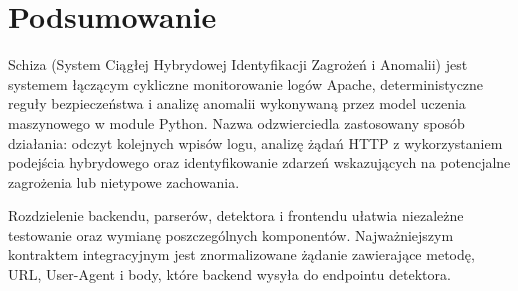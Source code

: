 \documentclass[12pt,a4paper]{article}
\newcommand{\project}{Schiza}
\begin{document}
\section{Podsumowanie}

\project{} (System Ciągłej Hybrydowej Identyfikacji Zagrożeń i Anomalii) jest
systemem łączącym cykliczne monitorowanie logów Apache, deterministyczne reguły
bezpieczeństwa i analizę anomalii wykonywaną przez model uczenia maszynowego
w module Python. Nazwa odzwierciedla zastosowany sposób działania: odczyt
kolejnych wpisów logu, analizę żądań HTTP z wykorzystaniem podejścia
hybrydowego oraz identyfikowanie zdarzeń wskazujących na potencjalne zagrożenia
lub nietypowe zachowania.

Rozdzielenie backendu, parserów, detektora i frontendu ułatwia niezależne
testowanie oraz wymianę poszczególnych komponentów. Najważniejszym kontraktem
integracyjnym jest znormalizowane żądanie zawierające metodę, URL, User-Agent
i body, które backend wysyła do endpointu detektora.
\end{document}
